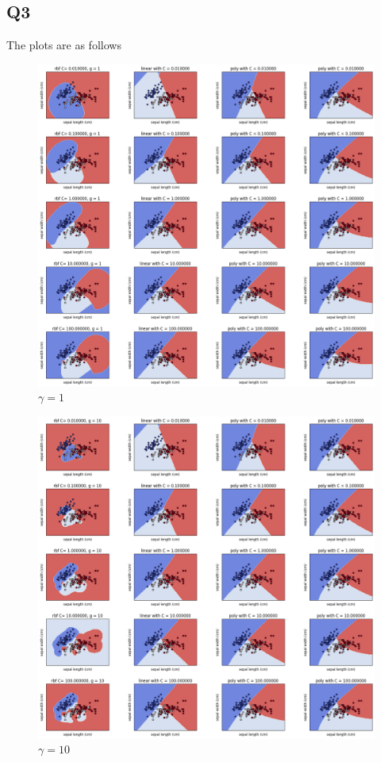 \subsection{Q3}
The plots are as follows
\begin{figure}[H]
    \includegraphics[scale = 0.45]{img/output.png}
    \caption{$\gamma = 1$}
    \label{fig:q3.1}
\end{figure}
\begin{figure}[H]
    \includegraphics[scale = 0.45]{img/output2.png}
    \caption{$\gamma = 10$}
    \label{fig:q3.2}
\end{figure}
